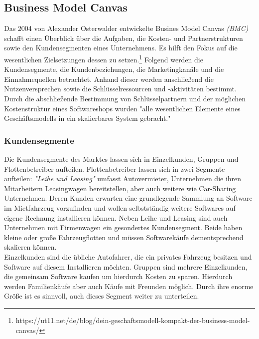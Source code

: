 
\subsection{Business Model Canvas} \label{bmc}
Das 2004 von Alexander Osterwalder entwickelte Busines Model Canvas \textit{(BMC)} schafft einen Überblick über die Aufgaben, die Kosten- und Partnerstrukturen sowie den Kundensegmenten eines Unternehmens. Es hilft den Fokus auf die wesentlichen Zielsetzungen dessen zu setzen.\footnote{https://ut11.net/de/blog/dein-geschaftsmodell-kompakt-der-business-model-canvas/} Folgend werden die Kundensegmente, die Kundenbeziehungen, die Marketingkanäle und die Einnahmequellen betrachtet. Anhand dieser werden anschließend die Nutzenversprechen sowie die Schlüsselressourcen und -aktivitäten bestimmt. Durch die abschließende Bestimmung von Schlüsselpartnern und der möglichen Kostenstruktur eines Softwareshops wurden "alle wesentlichen Elemente eines Geschäftsmodells in ein skalierbares System gebracht."\cite[S.\, 14]{bmc}

\subsubsection{Kundensegmente}
Die Kundensegmente des Marktes lassen sich in Einzelkunden, Gruppen und Flottenbetreiber aufteilen. Flottenbetreiber lassen sich in zwei Segmente aufteilen: \textit{"Leihe und Leasing"} umfasst Autovermieter, Unternehmen die ihren Mitarbeitern Leasingwagen bereitstellen, aber auch weitere wie Car-Sharing Unternehmen. Deren Kunden erwarten eine grundlegende Sammlung an Software im Mietfahrzeug vorzufinden und wollen selbstständig weitere Softwares auf eigene Rechnung installieren können. Neben Leihe und Leasing sind auch Unternehmen mit Firmenwagen ein gesondertes Kundensegment. Beide haben kleine oder große Fahrzeugflotten und müssen Softwarekäufe dementsprechend skalieren können. \\
Einzelkunden sind die übliche Autofahrer, die ein privates Fahrzeug besitzen und Software auf diesem Installieren möchten. Gruppen sind mehrere Einzelkunden, die gemeinsam Software kaufen um hierdurch Kosten zu sparen. Hierdurch werden Familienkäufe aber auch Käufe mit Freunden möglich. Durch ihre enorme Größe ist es sinnvoll, auch dieses Segment weiter zu unterteilen.

